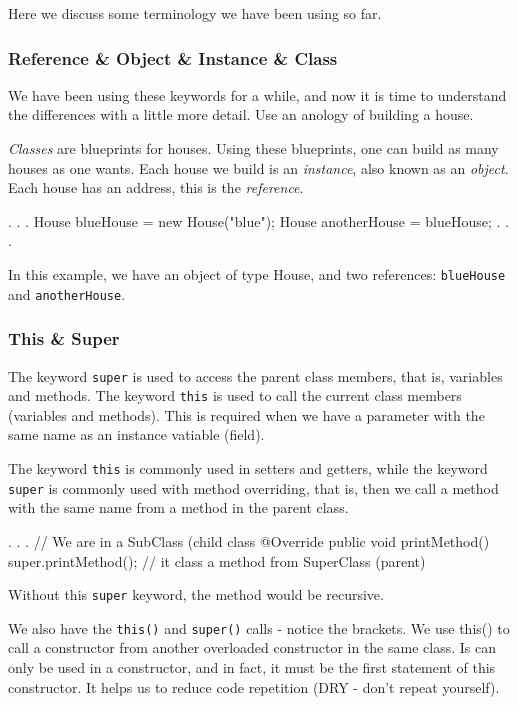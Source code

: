 Here we discuss some terminology we have been using so far. 

\subsubsection{Reference \& Object \& Instance \& Class}

We have been using these keywords for a while, and now it is time to understand the differences 
with a little more detail. Use an anology of building a house. 

\emph{Classes} are blueprints for houses. Using these blueprints, one can build as many houses as 
one wants. Each house we build is an \emph{instance}, also known as an \emph{object}. Each house 
has an address, this is the \emph{reference}.
\begin{listing}{1}
    . . .
    House blueHouse = new House("blue");
    House anotherHouse = blueHouse;
    . . .
\end{listing}
In this example, we have an object of type House, and two references: \verb|blueHouse| and 
\verb|anotherHouse|.

\subsubsection{This \& Super}

The keyword \verb|super| is used to access the parent class members, that is, variables and methods.
The keyword \verb|this| is used to call the current class members (variables and methods). This is 
required when we have a parameter with the same name as an instance vatiable (field). 

The keyword \verb|this| is commonly used in setters and getters, while the keyword \verb|super| is 
commonly used with method overriding, that is, then we call a method with the same name from a
method in the parent class.
\begin{listing}{1}
    . . . // We are in a SubClass (child class 
@Override 
    public void printMethod() {
        super.printMethod(); // it class a method from SuperClass (parent)
    }
\end{listing}
Without this \verb|super| keyword, the method would be recursive. 

We also have the \verb|this()| and \verb|super()| calls - notice the brackets. We use this() to call
a constructor from another overloaded constructor in the same class. Is can only be used in a 
constructor, and in fact, it must be the first statement of this constructor. It helps us to reduce
code repetition (DRY - don't repeat yourself).

